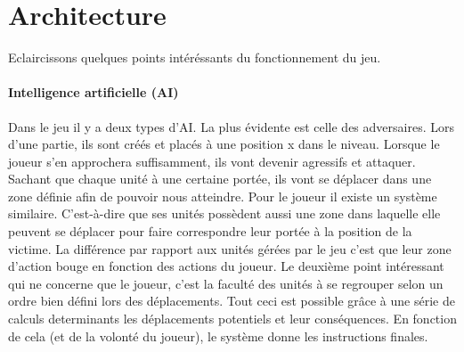\documentclass[a4paper,10pt]{article}
\begin{document}
  \pagebreak 
  \section{Architecture}
  Eclaircissons quelques points intéréssants du fonctionnement du jeu.
  \paragraph{Intelligence artificielle (AI)}
  Dans le jeu il y a deux types d'AI. La plus évidente est celle des adversaires. Lors d'une partie, ils sont créés et placés à une position x dans le niveau. Lorsque le joueur s'en approchera suffisamment, ils vont devenir agressifs et attaquer. Sachant que chaque unité à une certaine portée, ils vont se déplacer dans une zone définie afin de pouvoir nous atteindre.
  \newline Pour le joueur il existe un système similaire. C'est-à-dire que ses unités possèdent aussi une zone dans laquelle elle peuvent se déplacer pour faire correspondre leur portée à la position de la victime. La différence par rapport aux unités gérées par le jeu c'est que leur zone d'action bouge en fonction des actions du joueur.
  \newline Le deuxième point intéressant qui ne concerne que le joueur, c'est la faculté des unités à se regrouper selon un ordre bien défini lors des déplacements.
  \newline Tout ceci est possible grâce à une série de calculs determinants les déplacements potentiels et leur conséquences. En fonction de cela (et de la volonté du joueur), le système donne les instructions finales.
  
\end{document}
